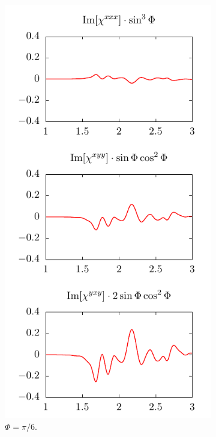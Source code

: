 \documentclass[aps,prb,10pt,letterpaper,notitlepage]{revtex4-1}
\begin{document}
\begin{figure}[t]
    ~ 
    \begin{subfigure}[b]{0.3\textwidth}
        \includegraphics[width=\textwidth]{rot/comps30.pdf}
        \caption{$\Phi = \pi/6$.}
    \end{subfigure}
    ~ 
    \begin{subfigure}[b]{0.3\textwidth}

\end{subfigure}
\end{figure}
\end{document}
